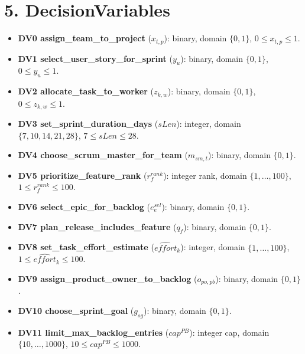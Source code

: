 \documentclass[11pt]{article}
\begin{document}
\section{5. DecisionVariables}
\begin{itemize}[leftmargin=2em]
  \item \textbf{DV0 assign\_team\_to\_project} ($x_{t,p}$): binary, domain $\{0,1\}$, $0\le x_{t,p}\le 1$.
  \item \textbf{DV1 select\_user\_story\_for\_sprint} ($y_u$): binary, domain $\{0,1\}$, $0\le y_u\le 1$.
  \item \textbf{DV2 allocate\_task\_to\_worker} ($z_{k,w}$): binary, domain $\{0,1\}$, $0\le z_{k,w}\le 1$.
  \item \textbf{DV3 set\_sprint\_duration\_days} ($sLen$): integer, domain $\{7,10,14,21,28\}$, $7\le sLen\le 28$.
  \item \textbf{DV4 choose\_scrum\_master\_for\_team} ($m_{sm,t}$): binary, domain $\{0,1\}$.
  \item \textbf{DV5 prioritize\_feature\_rank} ($r^{rank}_f$): integer rank, domain $\{1,\dots,100\}$, $1\le r^{rank}_f\le 100$.
  \item \textbf{DV6 select\_epic\_for\_backlog} ($e^{sel}_e$): binary, domain $\{0,1\}$.
  \item \textbf{DV7 plan\_release\_includes\_feature} ($q_f$): binary, domain $\{0,1\}$.
  \item \textbf{DV8 set\_task\_effort\_estimate} ($\widehat{effort}_k$): integer, domain $\{1,\dots,100\}$, $1\le \widehat{effort}_k\le 100$.
  \item \textbf{DV9 assign\_product\_owner\_to\_backlog} ($o_{po,pb}$): binary, domain $\{0,1\}$.
  \item \textbf{DV10 choose\_sprint\_goal} ($g_{sg}$): binary, domain $\{0,1\}$.
  \item \textbf{DV11 limit\_max\_backlog\_entries} ($cap^{PB}$): integer cap, domain $\{10,\dots,1000\}$, $10\le cap^{PB}\le 1000$.
\end{itemize}
\end{document}
